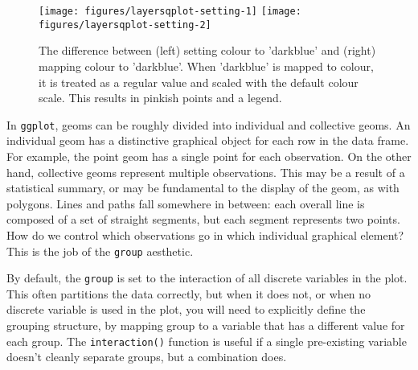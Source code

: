\begin{Shaded}
\begin{Highlighting}[]
 \NormalTok{(}\NormalTok{))}
 \NormalTok{)}
\end{Highlighting}
\end{Shaded}

\begin{figure}

{\centering \texttt{[image: figures/layersqplot-setting-1]} \texttt{[image: figures/layersqplot-setting-2]} 

}

\caption{The difference between (left) setting colour to 'darkblue' and (right) mapping colour to 'darkblue'. When 'darkblue' is mapped to colour, it is treated as a regular value and scaled with the default colour scale. This results in pinkish points and a legend.\label{fig:qplot-setting}}
\end{figure}


In \texttt{ggplot}, geoms can be roughly divided into individual and
collective geoms. An individual geom has a distinctive graphical object
for each row in the data frame. For example, the point geom has a single
point for each observation. On the other hand, collective geoms
represent multiple observations. This may be a result of a statistical
summary, or may be fundamental to the display of the geom, as with
polygons. Lines and paths fall somewhere in between: each overall line
is composed of a set of straight segments, but each segment represents
two points. How do we control which observations go in which individual
graphical element? This is the job of the \texttt{group} aesthetic.

By default, the \texttt{group} is set to the interaction of all discrete
variables in the plot. This often partitions the data correctly, but
when it does not, or when no discrete variable is used in the plot, you
will need to explicitly define the grouping structure, by mapping group
to a variable that has a different value for each group. The
\texttt{interaction()} function is useful if a single pre-existing
variable doesn't cleanly separate groups, but a combination does.

